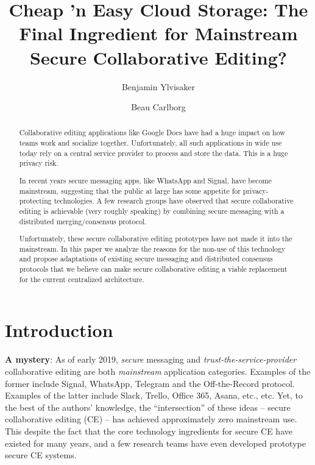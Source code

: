 \documentclass[runningheads]{llncs}
\begin{document}
\title{Cheap 'n Easy Cloud Storage: The Final Ingredient for Mainstream Secure Collaborative Editing?}

\author{Benjamin Ylvisaker \and
Beau Carlborg}


\maketitle

\begin{abstract}

Collaborative editing applications like Google Docs have had a huge impact on how teams work and socialize together.
Unfortunately, all such applications in wide use today rely on a central service provider to process and store the data.
This is a huge privacy risk.

In recent years secure messaging apps, like WhatsApp and Signal, have become mainstream, suggesting that the public at large has some appetite for privacy-protecting technologies.
A few research groups have observed that secure collaborative editing is achievable (very roughly speaking) by combining secure messaging with a distributed merging{\slash}consensus protocol.

Unfortunately, these secure collaborative editing prototypes have not made it into the mainstream.
In this paper we analyze the reasons for the non-use of this technology and propose adaptations of existing secure messaging and distributed consensus protocols that we believe can make secure collaborative editing a viable replacement for the current centralized architecture.

\end{abstract}

\section{Introduction}

\textbf{A mystery}:
As of early 2019, \emph{secure} messaging and \emph{trust-the-service-provider} collaborative editing are both \emph{mainstream} application categories.
Examples of the former include Signal, WhatsApp, Telegram and the Off-the-Record protocol.
Examples of the latter include Slack, Trello, Office 365, Asana, etc., etc.
Yet, to the best of the authors' knowledge, the ``intersection'' of these ideas -- secure collaborative editing (CE) -- has achieved approximately zero mainstream use.
This despite the fact that the core technology ingredients for secure CE have existed for many years, and a few research teams have even developed prototype secure CE systems.
\end{document}
